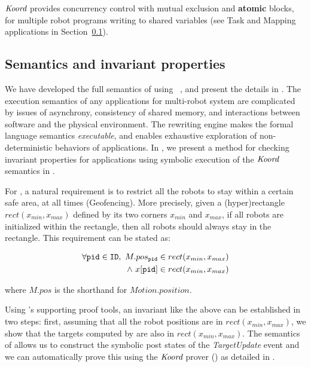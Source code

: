 $\emph{Koord}$ provides concurrency control with mutual exclusion and \textbf{atomic} blocks, for multiple robot programs writing to shared variables (see  {\sf Task} and {\sf Mapping} applications  in Section~\ref{}).


\subsection{Semantics and invariant properties}

We have developed the full semantics of \lgname using \K~\cite{rosu-serbanuta-2013-k}, and present the details in .
The execution semantics of any applications for multi-robot system are complicated by issues of asynchrony,
consistency of shared memory, and interactions between software and the physical environment.
The \K rewriting engine makes the formal language semantics \emph{executable},
and enables exhaustive exploration of non-deterministic behaviors of \lgname applications.
In , we present a method for checking invariant properties for \lgname applications using symbolic execution of the $\emph{Koord}$ semantics in \K.

For \LineForm, a natural requirement is to restrict all the robots to stay within a certain safe area, at all times (Geofencing).
More precisely, given a (hyper)rectangle $\mathit{rect}(x_{min}, x_{max})$ defined by its two corners $x_{min}$ and $x_{max}$,
if all robots are initialized within the rectangle, then all robots should always stay in the rectangle.
This requirement can be stated as:
\begin{invariant}
\label{inv:lineform}
\[
\begin{split}
    \forall \texttt{pid} \in \texttt{ID},\ M.pos_{\texttt{pid}} \in rect(x_{min}, x_{max}) \\
    \land\ x[\texttt{pid}] \in rect(x_{min}, x_{max})
\end{split}
\]
\end{invariant}
\noindent
where $M.pos$ is the shorthand for $Motion.position$.

Using \lgname's supporting proof tools, an invariant like the above can be established in two steps:
first, assuming that all the robot positions are in $\mathit{rect}(x_{min}, x_{max})$,
we show that the targets computed by \LineForm are also in $\mathit{rect}(x_{min}, x_{max})$.
The \K semantics of \lgname allows us to construct the symbolic post states of the \emph{TargetUpdate} event
and we can automatically prove this using the $\emph{Koord}$ prover () as detailed in .

